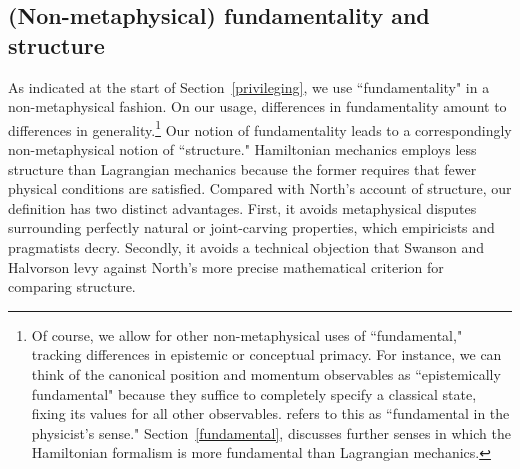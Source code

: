 \documentclass[letterpaper]{article}
\begin{document}



\subsection{(Non-metaphysical) fundamentality and structure}
\label{fundamentality}




As indicated at the start of Section~\ref{privileging}, we use ``fundamentality" in a non-metaphysical fashion. On our usage, differences in fundamentality amount to differences in generality.\footnote{Of course, we allow for other non-metaphysical uses of ``fundamental," tracking differences in epistemic or conceptual primacy. For instance, we can think of the canonical position and momentum observables as ``epistemically fundamental" because they suffice to completely specify a classical state, fixing its values for all other observables. \textcites[31, 200]{Ruetsche} refers to this as ``fundamental in the physicist's sense." Section~\ref{fundamental}, discusses further senses in which the Hamiltonian formalism is more fundamental than Lagrangian mechanics.} Our notion of fundamentality leads to a correspondingly non-metaphysical notion of ``structure." Hamiltonian mechanics employs less structure than Lagrangian mechanics because the former requires that fewer physical conditions are satisfied. Compared with North's \parencites*[]{North} account of structure, our definition has two distinct advantages. First, it avoids metaphysical disputes surrounding perfectly natural or joint-carving properties, which empiricists and pragmatists decry. Secondly, it avoids a technical objection that Swanson and Halvorson \parencites*[]{Swanson} levy against North's more precise mathematical criterion for comparing structure. 
\end{document}
